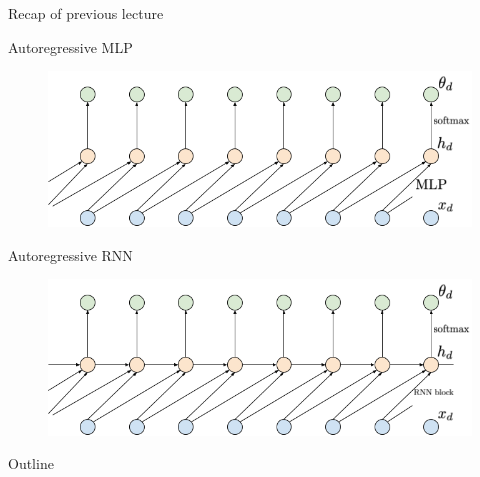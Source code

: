 \begin{frame}{Recap of previous lecture}
	\begin{block}{Autoregressive MLP}
		\vspace{-0.3cm}
 		\begin{figure}
		     \centering
		     \includegraphics[width=0.75\linewidth]{figs/sequential_MLP}
		 \end{figure}
	\end{block}
	\vspace{-0.3cm}
	\begin{block}{Autoregressive RNN}
	   	\vspace{-0.3cm}
		\begin{figure}
		   \centering
		   \includegraphics[width=0.75\linewidth]{figs/sequential_RNN}
		\end{figure}
	\end{block}
\end{frame}
\begin{frame}{Outline}
    \tableofcontents
\end{frame}
